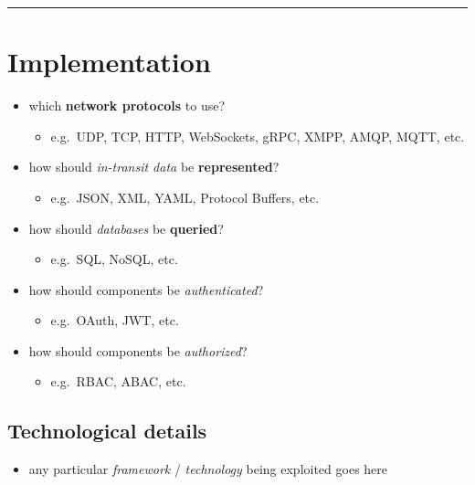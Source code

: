 \documentclass{scrartcl}
\begin{document}
\begin{center}\rule{0.5\linewidth}{0.5pt}\end{center}

\section{Implementation}\label{implementation}

\begin{itemize}
  \item which \textbf{network protocols} to use?

  \begin{itemize}
    \item e.g.~UDP, TCP, HTTP, WebSockets, gRPC, XMPP, AMQP, MQTT, etc.
  \end{itemize}
  \item how should \emph{in-transit data} be \textbf{represented}?

  \begin{itemize}
    \item e.g.~JSON, XML, YAML, Protocol Buffers, etc.
  \end{itemize}
  \item how should \emph{databases} be \textbf{queried}?

  \begin{itemize}
    \item e.g.~SQL, NoSQL, etc.
  \end{itemize}
  \item how should components be \emph{authenticated}?

  \begin{itemize}
    \item e.g.~OAuth, JWT, etc.
  \end{itemize}
  \item how should components be \emph{authorized}?

  \begin{itemize}
    \item e.g.~RBAC, ABAC, etc.
  \end{itemize}
\end{itemize}

\subsection{Technological details}\label{technological-details}

\begin{itemize}
  \item any particular \emph{framework} / \emph{technology} being exploited
  goes here
\end{itemize}
\end{document}
